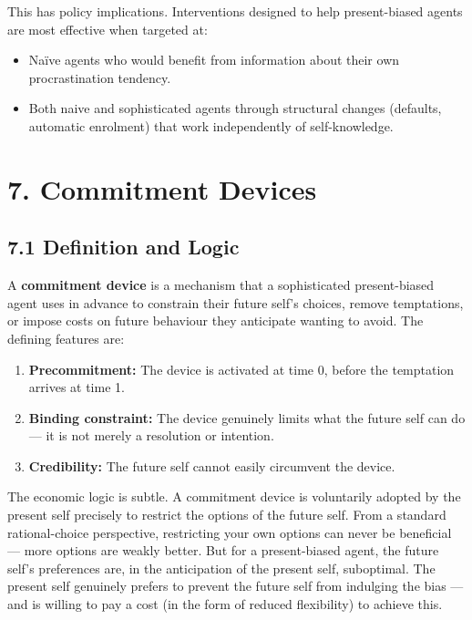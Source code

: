 \documentclass[12pt, letterpaper]{article}
\begin{document}
This has policy implications. Interventions designed to help present-biased agents are most effective when targeted at:
\begin{itemize}
\item Naïve agents who would benefit from information about their own procrastination tendency.
\item Both naive and sophisticated agents through structural changes (defaults, automatic enrolment) that work independently of self-knowledge.
\end{itemize}

\medskip


\section{7. Commitment Devices}



\subsection{7.1 Definition and Logic}


A \textbf{commitment device} is a mechanism that a sophisticated present-biased agent uses in advance to constrain their future self's choices, remove temptations, or impose costs on future behaviour they anticipate wanting to avoid. The defining features are:

\begin{enumerate}
\item \textbf{Precommitment:} The device is activated at time 0, before the temptation arrives at time 1.
\item \textbf{Binding constraint:} The device genuinely limits what the future self can do --- it is not merely a resolution or intention.
\item \textbf{Credibility:} The future self cannot easily circumvent the device.
\end{enumerate}

The economic logic is subtle. A commitment device is voluntarily adopted by the present self precisely to restrict the options of the future self. From a standard rational-choice perspective, restricting your own options can never be beneficial --- more options are weakly better. But for a present-biased agent, the future self's preferences are, in the anticipation of the present self, suboptimal. The present self genuinely prefers to prevent the future self from indulging the bias --- and is willing to pay a cost (in the form of reduced flexibility) to achieve this.
\end{document}
